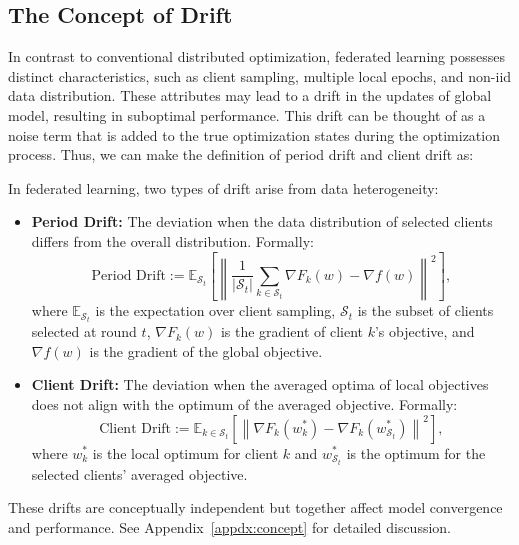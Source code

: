 \subsection{The Concept of Drift} \label{sec:impact}
In contrast to conventional distributed optimization, federated learning possesses distinct characteristics, such as client sampling, multiple local epochs, and non-iid data distribution. These attributes may lead to a drift in the updates of global model, resulting in suboptimal performance. This drift can be thought of as a noise term that is added to the true optimization states during the optimization process. Thus, we can make the definition of period drift and client drift as:

\begin{definition}\label{def:drifts}
In federated learning, two types of drift arise from data heterogeneity:
\begin{itemize}[leftmargin=*]
    \item \textbf{Period Drift:} The deviation when the data distribution of selected clients differs from the overall distribution. Formally:
    \begin{equation}
        \text{Period Drift} := \mathbb{E}_{\mathcal{S}_t} \left[ \left\| \frac{1}{|\mathcal{S}_t|} \sum_{k \in \mathcal{S}_t} \nabla F_k(w) - \nabla f(w) \right\|^2 \right],
    \end{equation}
    where $\mathbb{E}_{\mathcal{S}_t}$ is the expectation over client sampling, $\mathcal{S}_t$ is the subset of clients selected at round $t$, $\nabla F_k(w)$ is the gradient of client $k$'s objective, and $\nabla f(w)$ is the gradient of the global objective.
    
    \item \textbf{Client Drift:} The deviation when the averaged optima of local objectives does not align with the optimum of the averaged objective. Formally:
    \begin{equation}
        \text{Client Drift} := \mathbb{E}_{k \in \mathcal{S}_t} \left[ \left\| \nabla F_k(w_k^*) - \nabla F_k(w_{\mathcal{S}_t}^*) \right\|^2 \right],
    \end{equation}
    where $w_k^*$ is the local optimum for client $k$ and $w_{\mathcal{S}_t}^*$ is the optimum for the selected clients' averaged objective.
\end{itemize}
These drifts are conceptually independent but together affect model convergence and performance. See Appendix~\ref{appdx:concept} for detailed discussion.
\end{definition}

